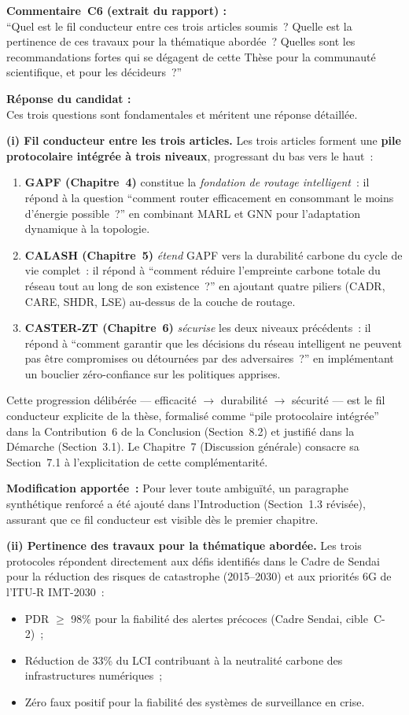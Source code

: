\documentclass[12pt,a4paper]{article}
\newcommand{\Commentaire}[2]{%
  \begin{reviewerbox}
    \textbf{Commentaire~#1 (extrait du rapport) :}\\#2
  \end{reviewerbox}%
}
\newcommand{\Reponse}[1]{%
  \begin{responsebox}
    \textbf{Réponse du candidat :}\\#1
  \end{responsebox}%
}
\begin{document}
\Commentaire{C6}{
  ``Quel est le fil conducteur entre ces trois articles soumis~? Quelle est la pertinence de ces
  travaux pour la thématique abordée~? Quelles sont les recommandations fortes qui se dégagent de
  cette Thèse pour la communauté scientifique, et pour les décideurs~?''
}

\Reponse{
Ces trois questions sont fondamentales et méritent une réponse détaillée.

\textbf{(i) Fil conducteur entre les trois articles.}
Les trois articles forment une \textbf{pile protocolaire intégrée à trois niveaux}, progressant du bas vers le haut~:
\begin{enumerate}[leftmargin=*, label=\arabic*.]
  \item \textbf{GAPF (Chapitre~4)} constitue la \emph{fondation de routage intelligent}~: il répond à la question ``comment router efficacement en consommant le moins d'énergie possible~?'' en combinant MARL et GNN pour l'adaptation dynamique à la topologie.
  \item \textbf{CALASH (Chapitre~5)} \emph{étend} GAPF vers la durabilité carbone du cycle de vie complet~: il répond à ``comment réduire l'empreinte carbone totale du réseau tout au long de son existence~?'' en ajoutant quatre piliers (CADR, CARE, SHDR, LSE) au-dessus de la couche de routage.
  \item \textbf{CASTER-ZT (Chapitre~6)} \emph{sécurise} les deux niveaux précédents~: il répond à ``comment garantir que les décisions du réseau intelligent ne peuvent pas être compromises ou détournées par des adversaires~?'' en implémentant un bouclier zéro-confiance sur les politiques apprises.
\end{enumerate}
Cette progression délibérée --- efficacité $\rightarrow$ durabilité $\rightarrow$ sécurité --- est le fil conducteur explicite de la thèse, formalisé comme ``pile protocolaire intégrée'' dans la Contribution~6 de la Conclusion (Section~8.2) et justifié dans la Démarche (Section~3.1). Le Chapitre~7 (Discussion générale) consacre sa Section~7.1 à l'explicitation de cette complémentarité.

\textbf{Modification apportée~:} Pour lever toute ambiguïté, un paragraphe synthétique renforcé a été ajouté dans l'Introduction (Section~1.3 révisée), assurant que ce fil conducteur est visible dès le premier chapitre.

\textbf{(ii) Pertinence des travaux pour la thématique abordée.}
Les trois protocoles répondent directement aux défis identifiés dans le Cadre de Sendai pour la réduction des risques de catastrophe (2015--2030) et aux priorités 6G de l'ITU-R IMT-2030~:
\begin{itemize}[leftmargin=*]
  \item PDR $\geq$ 98\% pour la fiabilité des alertes précoces (Cadre Sendai, cible~C-2)~;
  \item Réduction de 33\% du LCI contribuant à la neutralité carbone des infrastructures numériques~;
  \item Zéro faux positif pour la fiabilité des systèmes de surveillance en crise.
\end{itemize}

}
\end{document}
